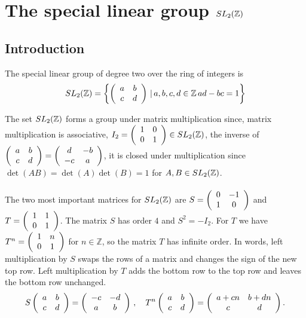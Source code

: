

\newenvironment{minipeqn}[1][]{\begin{minipage}[#1]{.75\textwidth}\begin{equation}}{\end{equation}\end{minipage}}

\ifpdf
    \graphicspath{{Chapter1/Chapter1Figs/PNG/}{Chapter1/Chapter1Figs/PDF/}{Chapter1/Chapter1Figs/}}
\else
    \graphicspath{{Chapter1/Chapter1Figs/EPS/}{Chapter1/Chapter1Figs/}}
\fi

\chapter{The special linear group $SL_2(\mathbb{Z})$}

\section{Introduction}


\begin{definition}
The special linear group of degree two over the ring of integers is 
$$SL_2(\mathbb{Z}) = \left\lbrace \left(\begin{array}{ c c } a & b \\ c & d \end{array} \right) \, \vert \, a,b,c,d \in \mathbb{Z}\, ad-bc =1 \right\rbrace$$
\end{definition}
The set $SL_2(\mathbb{Z})$ forms a group under matrix multiplication since, matrix multiplication is associative, $I_2 = \left(\begin{array}{ c c }  1 & 0 \\ 0 & 1 \end{array} \right) \in SL_2(\mathbb{Z})$, the inverse of $\left(\begin{array}{ c c } a & b \\ c & d \end{array} \right) = \left(\begin{array}{ c c }  d & -b \\ -c & a \end{array} \right)$, it is closed under multiplication since $\det(AB) = \det(A)\det(B) = 1$ for $A,B \in SL_2(\mathbb{Z})$.\\
\\


The two most important matrices for $SL_2(\mathbb{Z})$ are $S = \left(\begin{array}{ c c } 0 & -1 \\ 1 & 0 \end{array} \right)$ and $T = \left(\begin{array}{ c c } 1 & 1 \\ 0 & 1 \end{array} \right)$. The matrix $S$ has order $4$ and $S^2 = -I_2$. For $T$ we have $T^n = \left(\begin{array}{ c c } 1 & n \\ 0 & 1 \end{array} \right)$ for $n \in \mathbb{Z}$, so the matrix $T$ has infinite order.
In words, left multiplication by $S$ swaps the rows of a matrix and changes the sign of the new top row. Left multiplication by $T$ adds the bottom row to the top row and leaves the bottom row unchanged.
$$S\left(\begin{array}{ c c } a & b \\ c & d \end{array} \right) = \left(\begin{array}{ c c }  -c & -d \\ a & b \end{array} \right)\,,\quad 
T^n\left(\begin{array}{ c c } a & b \\ c & d \end{array} \right) = \left(\begin{array}{ c c }  a +cn & b+dn \\ c & d \end{array} \right).$$

